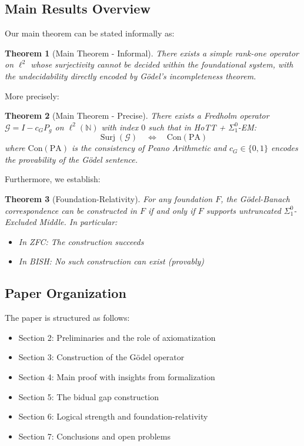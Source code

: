 \documentclass[11pt]{article}
\newtheorem{theorem}{Theorem}[section]
\theoremstyle{definition}
\newcommand{\N}{\mathbb{N}}
\newcommand{\lp}{\ell^{2}(\N)}
\newcommand{\SigOne}{\Sigma^{0}_{\!1}}
\newcommand{\PA}{\mathrm{PA}}
\newcommand{\Con}{\mathrm{Con}}
\DeclareMathOperator{\Surj}{Surj}
\begin{document}
\subsection{Main Results Overview}

Our main theorem can be stated informally as:

\begin{theorem}[Main Theorem - Informal]\label{thm:main_informal}
There exists a simple rank-one operator on $\ell^2$ whose surjectivity cannot be decided within the foundational system, with the undecidability directly encoded by Gödel's incompleteness theorem.
\end{theorem}

More precisely:

\begin{theorem}[Main Theorem - Precise]\label{thm:main_precise}
There exists a Fredholm operator $\mathcal{G} = I - c_G P_g$ on $\lp$ with 
index $0$ such that in HoTT + $\SigOne$-EM:
\[
\Surj(\mathcal{G}) \quad\Longleftrightarrow\quad \Con(\PA)
\]
where $\Con(\PA)$ is the consistency of Peano Arithmetic and $c_G \in \{0,1\}$ encodes the provability of the Gödel sentence.
\end{theorem}

Furthermore, we establish:

\begin{theorem}[Foundation-Relativity]\label{thm:foundation_relative}
For any foundation $F$, the Gödel-Banach correspondence can be constructed in $F$ if and only if $F$ supports untruncated $\SigOne$-Excluded Middle. In particular:
\begin{itemize}
\item In ZFC: The construction succeeds
\item In BISH: No such construction can exist (provably)
\end{itemize}
\end{theorem}

\subsection{Paper Organization}

The paper is structured as follows:
\begin{itemize}
\item Section 2: Preliminaries and the role of axiomatization
\item Section 3: Construction of the Gödel operator
\item Section 4: Main proof with insights from formalization
\item Section 5: The bidual gap construction
\item Section 6: Logical strength and foundation-relativity
\item Section 7: Conclusions and open problems
\end{itemize}
\end{document}
